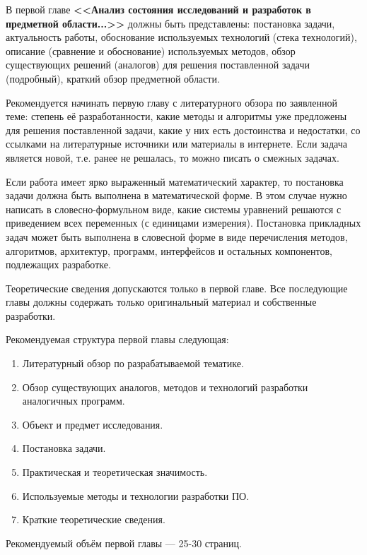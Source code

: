 \documentclass[14pt]{extarticle}
\begin{document}
В первой главе {\bf <<Анализ состояния исследований и разработок в предметной области...>>} должны быть представлены: постановка задачи, актуальность работы, обоснование используемых технологий (стека технологий), описание (сравнение и обоснование) используемых методов, обзор существующих решений (аналогов) для решения поставленной задачи (подробный), краткий обзор предметной области.
\par Рекомендуется начинать первую главу с литературного обзора по заявленной теме: степень её разработанности, какие методы и алгоритмы уже предложены для решения поставленной  задачи, какие у них есть достоинства и недостатки, со ссылками на литературные источники или материалы в интернете. Если задача является новой, т.е. ранее не решалась, то можно писать о смежных задачах. 
\par Если работа имеет ярко выраженный математический характер, то постановка задачи должна быть выполнена в математической форме. В этом случае нужно написать в словесно-формульном виде, какие системы уравнений решаются с приведением всех переменных (с единицами измерения). Постановка прикладных задач может быть выполнена в словесной форме в виде перечисления методов, алгоритмов, архитектур, программ, интерфейсов и остальных компонентов, подлежащих разработке.
\par Теоретические сведения допускаются только в первой главе. Все последующие главы должны содержать только оригинальный материал и собственные разработки.
\par Рекомендуемая структура первой главы следующая:
\begin{enumerate}[label=\arabic*.]
\item Литературный обзор по разрабатываемой тематике.
\item Обзор существующих аналогов, методов и технологий разработки аналогичных программ.
\item Объект и предмет исследования.
\item Постановка задачи.
\item Практическая и теоретическая значимость.
\item Используемые методы и технологии разработки ПО.
\item Краткие теоретические сведения.
\end{enumerate}

Рекомендуемый объём первой главы --- 25-30 страниц.
\end{document}
